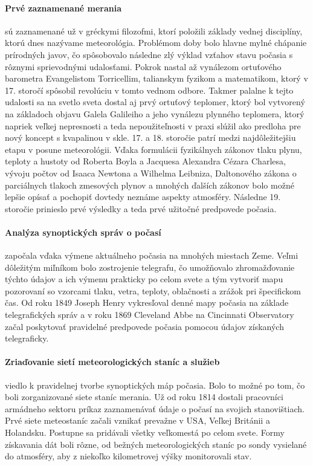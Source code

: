 \paragraph{Prvé zaznamenané merania} sú zaznamenané už v gréckymi filozofmi, ktorí položili základy vednej disciplíny, ktorú dnes nazývame meteorológia. Problémom doby bolo hlavne mylné chápanie prírodných javov, čo spôsobovalo následne zlý výklad vzťahov stavu počasia s rôznymi sprievodnými udalosťami. Pokrok nastal až vynálezom ortuťového barometra Evangelistom Torricellim, talianskym fyzikom a matematikom, ktorý v 17. storočí spôsobil revolúciu v tomto vednom odbore. Takmer palalne k tejto udalosti sa na svetlo sveta dostal aj prvý ortuťový teplomer, ktorý bol vytvorený na základoch objavu Galela Galileiho a jeho vynálezu plynného teplomera, ktorý napriek veľkej nepresnosti a teda nepoužiteľnosti v praxi slúžil ako predloha pre nový koncept s kvapalinou v skle.
17. a 18. storočie patrí medzi najdôležitejšiu etapu v posune meteorológii. Vďaka formulácii fyzikálnych zákonov tlaku plynu, teploty a hustoty od Roberta Boyla a Jacquesa Alexandra Cézara Charlesa, vývoju počtov od Isaaca Newtona a Wilhelma Leibniza, Daltonového zákona o parciálnych tlakoch zmesových plynov a mnohých ďalších zákonov bolo možné lepšie opísať a pochopiť dovtedy neznáme aspekty atmosféry. Následne 19. storočie prinieslo prvé výsledky a teda prvé užitočné predpovede počasia.

\paragraph{Analýza synoptických správ o počasí} započala vďaka výmene aktuálneho počasia na mnohých miestach Zeme. Veľmi dôležitým miľníkom bolo zostrojenie telegrafu, čo umožňovalo zhromažďovanie týchto údajov a ich výmenu prakticky po celom svete a tým vytvoriť mapu pozorovaní so vzorcami tlaku, vetra, teploty, oblačnosti a zrážok pri špecifickom čas. Od roku 1849 Joseph Henry vykresľoval denné mapy počasia na základe telegrafických správ a v roku 1869 Cleveland Abbe na Cincinnati Observatory začal poskytovať pravidelné predpovede počasia pomocou údajov získaných telegraficky.

\paragraph{Zriaďovanie sietí meteorologických staníc a služieb} viedlo k pravidelnej tvorbe synoptických máp počasia. Bolo to možné po tom, čo boli zorganizované siete staníc merania. Už od roku 1814 dostali pracovníci armádneho sektoru príkaz zaznamenávať údaje o počasí na svojich stanovištiach. Prvé siete meteostaníc začali vznikať prevažne v USA, Veľkej Británii a Holandsku. Postupne sa pridávali všetky veľkomestá po celom svete. Formy získavania dát boli rôzne, od bežných meteorologických staníc po sondy vysielané do atmosféry, aby z niekoľko kilometrovej výšky monitorovali stav. 

